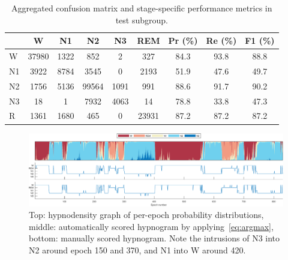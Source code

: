 \begin{table}[tb]
    \small
    \setlength{\tabcolsep}{4pt}
    \caption[MASSCv1 test group confusion matrix]{Aggregated confusion matrix and stage-specific performance metrics in test subgroup.}
    \label{tab:test_performance_aggregated}
    \centering
    \begin{tabular}{@{}lcccccccc@{}}
        \toprule
                 & W     & N1   & N2    & N3   & REM   & Pr (\%) & Re (\%) & F1 (\%) \\ \midrule
        W        & 37980 & 1322 & 852   & 2    & 327   & 84.3    & 93.8    & 88.8    \\
        N1       & 3922  & 8784 & 3545  & 0    & 2193  & 51.9    & 47.6    & 49.7    \\
        N2       & 1756  & 5136 & 99564 & 1091 & 991   & 88.6    & 91.7    & 90.2    \\
        N3       & 18    & 1    & 7932  & 4063 & 14    & 78.8    & 33.8    & 47.3    \\
        R        & 1361  & 1680 & 465   & 0    & 23931 & 87.2    & 87.2    & 87.2    \\ \bottomrule
    \end{tabular}
\end{table}
\begin{figure}[tb]
    \centering
    \includegraphics[width=\textwidth]{figures/test_maxacc_id1627-eps-converted-to.pdf}
    \caption[MASSCv1 hypnodensity example]{Top: hypnodensity graph of per-epoch probability distributions, middle: automatically scored hypnogram by applying~\cref{eq:argmax}, bottom: manually scored hypnogram. Note the intrusions of N3 into N2 around epoch 150 and 370, and N1 into W around 420.}
    \label{fig:hypnodensity}
\end{figure}

